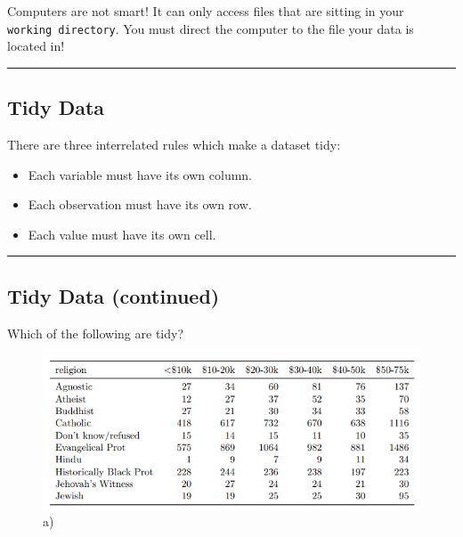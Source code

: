 \documentclass[
  letterpaper,
  DIV=11,
  numbers=noendperiod]{scrreprt}
\providecommand{\tightlist}{%
  \setlength{\itemsep}{0pt}\setlength{\parskip}{0pt}}\usepackage{longtable,booktabs,array}
\begin{document}
Computers are not smart! It can only access files that are sitting in
your \texttt{working\ directory}. You must direct the computer to the
file your data is located in!

\begin{center}\rule{0.5\linewidth}{0.5pt}\end{center}

\hypertarget{tidy-data}{%
\subsection*{Tidy Data}\label{tidy-data}}

There are three interrelated rules which make a dataset tidy:

\begin{itemize}
\tightlist
\item
  Each variable must have its own column.
\item
  Each observation must have its own row.
\item
  Each value must have its own cell.
\end{itemize}

\begin{center}\rule{0.5\linewidth}{0.5pt}\end{center}

\hypertarget{tidy-data-continued}{%
\subsection*{Tidy Data (continued)}\label{tidy-data-continued}}

Which of the following are tidy?

\begin{figure}

{\centering \includegraphics{images/images_lecture/tidy5.PNG}

}

\caption{a)}

\end{figure}
\end{document}
